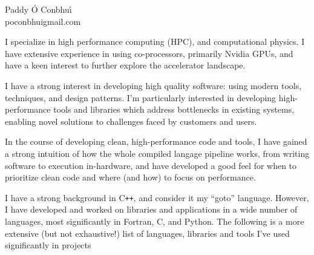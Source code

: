 \documentclass[11pt]{article}
\newcommand{\resumeSection}[1]{
    \par
    \large {\sc {#1}}
    \par
    \vspace{-0.9\baselineskip}
    \hrulefill
    \vspace{0.25\baselineskip}
    \par
}
\newenvironment{resumeSubSectionBody}{
    \par
    \vspace{-0.4\parskip}
    \begin{small}
    \par
} {
    \par
    \end{small}
    \par
}
\begin{document}

%
%
\begin{center}
    { \huge \textbf \sc Paddy \'O Conbhu\'\i } \\
    poconbhui\raisebox{-0.075\baselineskip}{@}gmail.com
\end{center}




\resumeSection{Software Development}


%
%
\begin{resumeSubSectionBody}

    I specialize in high performance computing (HPC), and computational physics.
    I have extensive experience in using co-processors, primarily Nvidia GPUs,
    and have a keen interest to further explore the accelerator landscape.

    I have a strong interest in developing high quality software: using modern
    tools, techniques, and design patterns.
    I'm particularly interested in developing high-performance tools and
    libraries which address bottlenecks in existing systems,
    enabling novel solutions to challenges faced by customers and users.

    In the course of developing clean, high-performance code and tools, I have
    gained a strong intuition of how the whole compiled langage pipeline works,
    from writing software to execution in-hardware, and have developed a
    good feel for when to prioritize clean code and where (and how) to focus on
    performance.


    I have a strong background in C\verb!++!, and consider it my ``goto''
    language.
    However, I have developed and worked on libraries and applications in a wide
    number of languages, most significantly in Fortran, C, and Python.
    The following is a more extensive (but not exhaustive!) list of languages,
    libraries and tools I've used significantly in projects


\end{resumeSubSectionBody}
\end{document}
